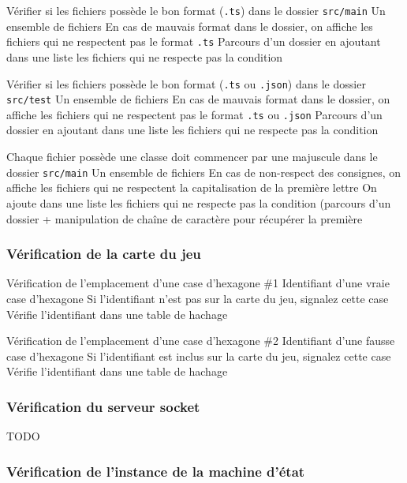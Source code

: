 \mytest
{Vérifier si les fichiers possède le bon format (\texttt{.ts}) dans le dossier \texttt{src/main}}
{Un ensemble de fichiers}
{En cas de mauvais format dans le dossier, on affiche les fichiers qui ne respectent pas le format \texttt{.ts}}
{Parcours d'un dossier en ajoutant dans une liste les fichiers qui ne respecte pas la condition}

\mytest
{Vérifier si les fichiers possède le bon format (\texttt{.ts} ou \texttt{.json}) dans le dossier \texttt{src/test}}
{Un ensemble de fichiers}
{En cas de mauvais format dans le dossier, on affiche les fichiers qui ne respectent pas le format \texttt{.ts} ou \texttt{.json}}
{Parcours d'un dossier en ajoutant dans une liste les fichiers qui ne respecte pas la condition}

\mytest
{Chaque fichier possède une classe doit commencer par une majuscule dans le dossier \texttt{src/main}}
{Un ensemble de fichiers}
{En cas de non-respect des consignes, on affiche les fichiers qui ne respectent la capitalisation de la première lettre}
{On ajoute dans une liste les fichiers qui ne respecte pas la condition (parcours d'un dossier + manipulation de chaîne de caractère pour récupérer la première}

\subsubsection{Vérification de la carte du jeu}

\mytest
{Vérification de l'emplacement d'une case d'hexagone \#1}
{Identifiant d'une vraie case d'hexagone}
{Si l'identifiant n'est pas sur la carte du jeu, signalez cette case}
{Vérifie l'identifiant dans une table de hachage}

\mytest
{Vérification de l'emplacement d'une case d'hexagone \#2}
{Identifiant d'une fausse case d'hexagone}
{Si l'identifiant est inclus sur la carte du jeu, signalez cette case}
{Vérifie l'identifiant dans une table de hachage}

\subsubsection{Vérification du serveur socket}

TODO

\subsubsection{Vérification de l'instance de la machine d'état}


